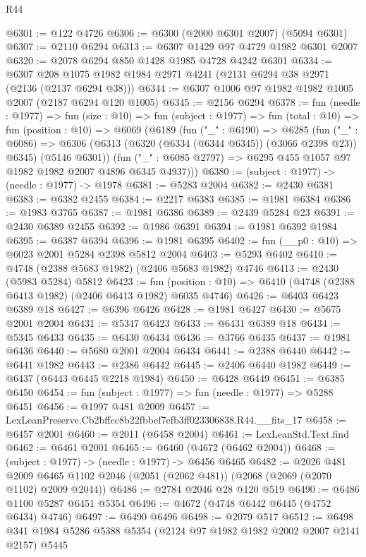 \begin{lexlean}{R44}
\begin{coremodule}
@6301 := @122 @4726
@6306 := @6300 (@2000 @6301 @2007) (@5094 @6301)
@6307 := @2110 @6294
@6313 := @6307 @1429 @97 @4729 @1982 @6301 @2007
@6320 := @2078 @6294 @850 @1428 @1985 @4728 @4242 @6301
@6334 := @6307 @208 @1075 @1982 @1984 @2971 @4241 (@2131 @6294 @38 @2971 (@2136 (@2137 @6294 @38)))
@6344 := @6307 @1006 @97 @1982 @1982 @1005 @2007 (@2187 @6294 @120 @1005)
@6345 := @2156 @6294
@6378 := fun (needle : @1977) =>
  fun (size : @10) =>
  fun (subject : @1977) =>
  fun (total : @10) =>
  fun (position : @10) =>
  @6069
    (@6189
      (fun ("_" : @6190) =>
      @6285
        (fun ("_" : @6086) =>
        @6306 (@6313 (@6320 (@6334 (@6344 @6345)) (@3066 @2398 @23)) @6345) (@5146 @6301))
        (fun ("_" : @6085 @2797) => @6295 @455 @1057 @97 @1982 @1982 @2007 @4896 @6345 @4937)))
@6380 := (subject : @1977) -> (needle : @1977) -> @1978
@6381 := @5283 @2004
@6382 := @2430 @6381
@6383 := @6382 @2455
@6384 := @2217 @6383
@6385 := @1981 @6384
@6386 := @1983 @3765
@6387 := @1981 @6386
@6389 := @2439 @5284 @23
@6391 := @2430 @6389 @2455
@6392 := @1986 @6391
@6394 := @1981 @6392 @1984
@6395 := @6387 @6394
@6396 := @1981 @6395
@6402 := fun (__p0 : @10) => @6023 @2001 @5284 @2398 @5812 @2004
@6403 := @5293 @6402
@6410 := @4748 (@2388 @5683 @1982) (@2406 @5683 @1982) @4746
@6413 := @2430 (@5983 @5284) @5812
@6423 := fun (position : @10) => @6410 (@4748 (@2388 @6413 @1982) (@2406 @6413 @1982) @6035 @4746)
@6426 := @6403 @6423 @6389 @18
@6427 := @6396 @6426
@6428 := @1981 @6427
@6430 := @5675 @2001 @2004
@6431 := @5347 @6423
@6433 := @6431 @6389 @18
@6434 := @5345 @6433
@6435 := @6430 @6434
@6436 := @3766 @6435
@6437 := @1981 @6436
@6440 := @5680 @2001 @2004 @6434
@6441 := @2388 @6440
@6442 := @6441 @1982
@6443 := @2386 @6442
@6445 := @2406 @6440 @1982
@6449 := @6437 (@6443 @6445 @2218 @1984)
@6450 := @6428 @6449
@6451 := @6385 @6450
@6454 := fun (subject : @1977) => fun (needle : @1977) => @5288 @6451
@6456 := @1997 @481 @2009
@6457 := LexLeanPreserve.Cb2bffcc8b22fbbef7efb3ff023306838.R44.__fits_17
@6458 := @6457 @2001
@6460 := @2011 (@6458 @2004)
@6461 := LexLeanStd.Text.find
@6462 := @6461 @2001
@6465 := @6460 (@4672 (@6462 @2004))
@6468 := (subject : @1977) -> (needle : @1977) -> @6456 @6465
@6482 := @2026
    @481
    @2009
    @6465
    @1102
    @2046
    (@2051 (@2062 @481))
    (@2068 (@2069 (@2070 @1102) @2009 @2044))
@6486 := @2784 @2046 @28 @120 @519
@6490 := @6486 @1100 @5287 @6451 @5354
@6496 := @4672 (@4748 @6442 @6445 (@4752 @6434) @4746)
@6497 := @6490 @6496
@6498 := @2079 @517
@6512 := @6498 @341 @1984 @5286 @5388 @5354 (@2124 @97 @1982 @1982 @2002 @2007 @2141 @2157) @5445

\end{coremodule}
\end{lexlean}
